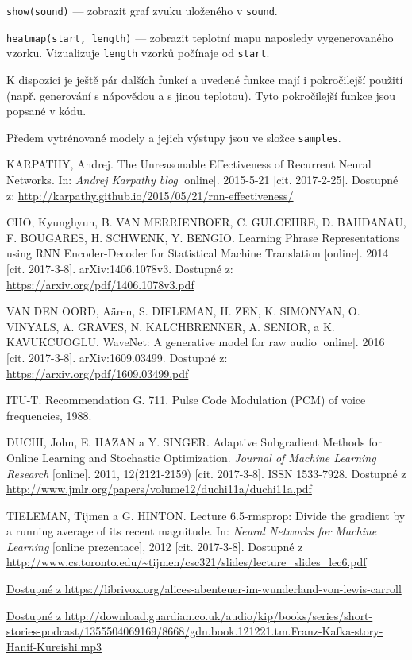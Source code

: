 \documentclass[a4]{article}
\begin{document}
\verb|show(sound)| --- zobrazit graf zvuku uloženého v \verb|sound|.

\verb|heatmap(start, length)| --- zobrazit teplotní mapu naposledy vygenerovaného vzorku. Vizualizuje \verb|length| vzorků počínaje od \verb|start|.

K dispozici je ještě pár dalších funkcí a uvedené funkce mají i pokročilejší použití (např. generování s nápovědou a s jinou teplotou). Tyto pokročilejší funkce jsou popsané v kódu.

Předem vytrénované modely a jejich výstupy jsou ve složce \verb|samples|.

\begin{thebibliography}{9}

KARPATHY, Andrej.
The Unreasonable Effectiveness of Recurrent Neural Networks.
In: \textit{Andrej Karpathy blog} [online]. 2015-5-21 [cit. 2017-2-25].
Dostupné z: \url{http://karpathy.github.io/2015/05/21/rnn-effectiveness/}

CHO, Kyunghyun, B. VAN MERRIENBOER, C. GULCEHRE, D. BAHDANAU, F. BOUGARES, H. SCHWENK, Y. BENGIO.
Learning Phrase Representations using RNN Encoder-Decoder for Statistical Machine Translation [online].
2014 [cit. 2017-3-8].
arXiv:1406.1078v3.
Dostupné z: \url{https://arxiv.org/pdf/1406.1078v3.pdf}


VAN DEN OORD, Aären, S. DIELEMAN, H. ZEN, K. SIMONYAN, O. VINYALS, A. GRAVES, N. KALCHBRENNER, A. SENIOR, a K. KAVUKCUOGLU.
WaveNet: A generative model for raw audio [online].
2016 [cit. 2017-3-8].
arXiv:1609.03499.
Dostupné z: \url{https://arxiv.org/pdf/1609.03499.pdf}

ITU-T. Recommendation G. 711. Pulse Code Modulation (PCM) of voice frequencies, 1988.

DUCHI, John, E. HAZAN a Y. SINGER. Adaptive Subgradient Methods for Online Learning and Stochastic Optimization. \textit{Journal of Machine Learning Research} [online]. 2011, 12(2121-2159) [cit. 2017-3-8]. ISSN 1533-7928. Dostupné z \url{http://www.jmlr.org/papers/volume12/duchi11a/duchi11a.pdf}

TIELEMAN, Tijmen a G. HINTON. Lecture 6.5-rmsprop: Divide the gradient by a running average of its recent magnitude. In: \textit{Neural Networks for Machine Learning} [online prezentace], 2012 [cit. 2017-3-8]. Dostupné z \url{http://www.cs.toronto.edu/~tijmen/csc321/slides/lecture_slides_lec6.pdf}

\url{Dostupné z https://librivox.org/alices-abenteuer-im-wunderland-von-lewis-carroll}

\url{Dostupné z http://download.guardian.co.uk/audio/kip/books/series/short-stories-podcast/1355504069169/8668/gdn.book.121221.tm.Franz-Kafka-story-Hanif-Kureishi.mp3}


\end{thebibliography}
\end{document}
